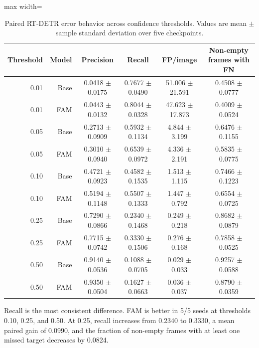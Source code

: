 \begin{table}[htbp]
  \centering
  \caption{Paired RT-DETR error behavior across confidence thresholds. Values
  are mean \(\pm\) sample standard deviation over five checkpoints.}
  \label{tab:error-thresholds}
  \begin{adjustbox}{max width=\textwidth}
  \begin{tabular}{rrcccc}
    \toprule
    Threshold & Model & Precision & Recall & FP/image & Non-empty frames with FN \\
    \midrule
    0.01 & Base & 0.0418 \(\pm\) 0.0175 & 0.7677 \(\pm\) 0.0490 & 51.006 \(\pm\) 21.591 & 0.4508 \(\pm\) 0.0777 \\
    0.01 & FAM & 0.0443 \(\pm\) 0.0132 & 0.8044 \(\pm\) 0.0328 & 47.623 \(\pm\) 17.873 & 0.4009 \(\pm\) 0.0524 \\
    0.05 & Base & 0.2713 \(\pm\) 0.0909 & 0.5932 \(\pm\) 0.1134 & 4.844 \(\pm\) 3.199 & 0.6476 \(\pm\) 0.1155 \\
    0.05 & FAM & 0.3010 \(\pm\) 0.0940 & 0.6539 \(\pm\) 0.0972 & 4.336 \(\pm\) 2.191 & 0.5835 \(\pm\) 0.0775 \\
    0.10 & Base & 0.4721 \(\pm\) 0.0923 & 0.4582 \(\pm\) 0.1535 & 1.513 \(\pm\) 1.115 & 0.7466 \(\pm\) 0.1223 \\
    0.10 & FAM & 0.5194 \(\pm\) 0.1148 & 0.5507 \(\pm\) 0.1333 & 1.447 \(\pm\) 0.792 & 0.6554 \(\pm\) 0.0725 \\
    0.25 & Base & 0.7290 \(\pm\) 0.0866 & 0.2340 \(\pm\) 0.1468 & 0.249 \(\pm\) 0.218 & 0.8682 \(\pm\) 0.0879 \\
    0.25 & FAM & 0.7715 \(\pm\) 0.0742 & 0.3330 \(\pm\) 0.1506 & 0.276 \(\pm\) 0.168 & 0.7858 \(\pm\) 0.0525 \\
    0.50 & Base & 0.9140 \(\pm\) 0.0536 & 0.1088 \(\pm\) 0.0705 & 0.029 \(\pm\) 0.033 & 0.9257 \(\pm\) 0.0588 \\
    0.50 & FAM & 0.9350 \(\pm\) 0.0504 & 0.1627 \(\pm\) 0.0663 & 0.036 \(\pm\) 0.037 & 0.8790 \(\pm\) 0.0359 \\
    \bottomrule
  \end{tabular}
  \end{adjustbox}
\end{table}

Recall is the most consistent difference. FAM is better in 5/5 seeds at
thresholds 0.10, 0.25, and 0.50. At 0.25, recall increases from 0.2340 to
0.3330, a mean paired gain of 0.0990, and the fraction of non-empty frames with
at least one missed target decreases by 0.0824.

